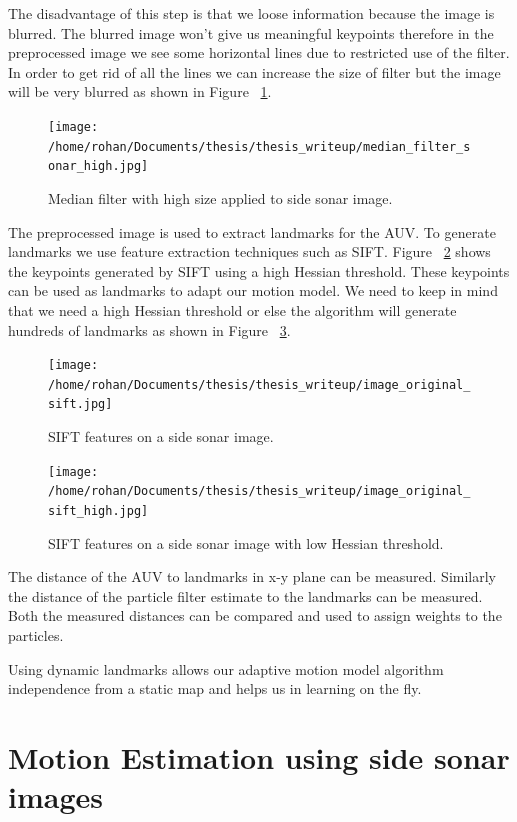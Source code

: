 \documentclass[12pt]{dalcsthesis}
\begin{document}
The disadvantage of this step is that we loose information because the image is blurred. The blurred image won't give us meaningful keypoints therefore in the preprocessed image we see some horizontal lines due to restricted use of the filter. In order to get rid of all the lines we can increase the size of filter but the image will be very blurred as shown in Figure ~\ref{fig- side sonar median high}.
\begin{figure}
  \centering
     {\texttt{[image: /home/rohan/Documents/thesis/thesis\_writeup/median\_filter\_sonar\_high.jpg]}}
  \caption{\label{fig- side sonar median high} Median filter with high size applied to side sonar image.}
\end{figure}

The preprocessed image is used to extract landmarks for the AUV. To generate landmarks we use feature extraction techniques such as SIFT. Figure ~\ref{fig- side sonar sift} shows the keypoints generated by SIFT using a high Hessian threshold. These keypoints can be used as landmarks to adapt our motion model. We need to keep in mind that we need a high Hessian threshold or else the algorithm will generate hundreds of landmarks as shown in Figure ~\ref{fig- side sonar sift high}.
\begin{figure}
  \centering
     {\texttt{[image: /home/rohan/Documents/thesis/thesis\_writeup/image\_original\_sift.jpg]}}
  \caption{\label{fig- side sonar sift} SIFT features on a side sonar image.}
\end{figure}

\begin{figure}
  \centering
     {\texttt{[image: /home/rohan/Documents/thesis/thesis\_writeup/image\_original\_sift\_high.jpg]}}
  \caption{\label{fig- side sonar sift high} SIFT features on a side sonar image with low Hessian threshold.}
\end{figure}


The distance of the AUV to landmarks in x-y plane can be measured. Similarly the distance of the particle filter estimate to the landmarks can be measured. Both the measured distances can be compared and used to assign weights to the particles. 

Using dynamic landmarks allows our adaptive motion model algorithm independence from a static map and helps us in learning on the fly.  

\section{Motion Estimation using side sonar images}
\end{document}
